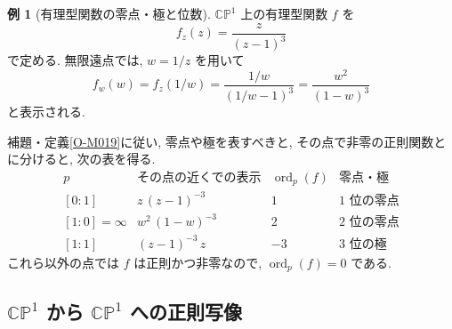 \documentclass[dvipdfmx,a4paper,11pt]{article} %
\newcommand{\C}{\mathbb{C}}
\theoremstyle{definition}
\numberwithin{equation}{section}
\newtheorem{exa}[thm]{例}
\begin{document}
\begin{exa}[有理型関数の零点・極と位数]\label{O-M020}
$\C\mathbb P^1$ 上の有理型関数 $f$ を
\[
f_z(z)=\frac{z}{(z-1)^3}
\]
で定める.
無限遠点では, $w=1/z$ を用いて
\[
f_w(w)=f_z(1/w)
=\frac{1/w}{(1/w-1)^3}
=\frac{w^2}{(1-w)^3}
\]
と表示される.

補題・定義\ref{O-M019}に従い,
零点や極を表すべきと, その点で非零の正則関数とに分けると,
次の表を得る.
\[
\begin{array}{c|c|c|c}
p&\text{その点の近くでの表示}
&\operatorname{ord}_p(f)&\text{零点・極}\\ \hline
[0:1]
&z\,(z-1)^{-3}
&1&1\text{ 位の零点}\\[6pt]
[1:0]=\infty
&w^2\, (1-w)^{-3}
&2&2\text{ 位の零点}\\[6pt]
[1:1]
&(z-1)^{-3}\, z
&-3&3\text{ 位の極}
\end{array}
\]
これら以外の点では $f$ は正則かつ非零なので,
$\operatorname{ord}_p(f)=0$ である.
\end{exa}




\subsection{$\C\mathbb P^1$ から $\C\mathbb P^1$ への正則写像}\label{O-S012}
\end{document}
